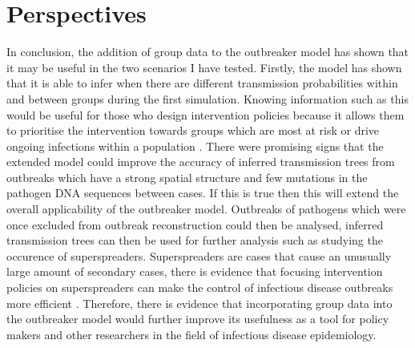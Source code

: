 \documentclass[11pt,a4paper]{report}
\begin{document}
\section{Perspectives}
In conclusion, the addition of group data to the outbreaker model has shown that it may be useful in the two scenarios I have tested. Firstly, the model has shown that it is able to infer when there are different transmission probabilities within and between groups during the first simulation. Knowing information such as this would be useful for those who design intervention policies because it allows them to prioritise the intervention towards groups which are most at risk or drive ongoing infections within a population \citep{Wallinga10,Dushoff07}. There were promising signs that the extended model could improve the accuracy of inferred transmission trees from outbreaks which have a strong spatial structure and few mutations in the pathogen DNA sequences between cases. If this is true then this will extend the overall applicability of the outbreaker model. Outbreaks of pathogens which were once excluded from outbreak reconstruction could then be analysed, inferred transmission trees can then be used for further analysis such as studying the occurence of superspreaders. Superspreaders are cases that cause an unusually large amount of secondary cases, there is evidence that focusing intervention policies on superspreaders can make the control of infectious disease outbreaks more efficient \citep{Lloyd05}. Therefore, there is evidence that incorporating group data into the outbreaker model would further improve its usefulness as a tool for policy makers and other researchers in the field of infectious disease epidemiology.   




\end{document}
